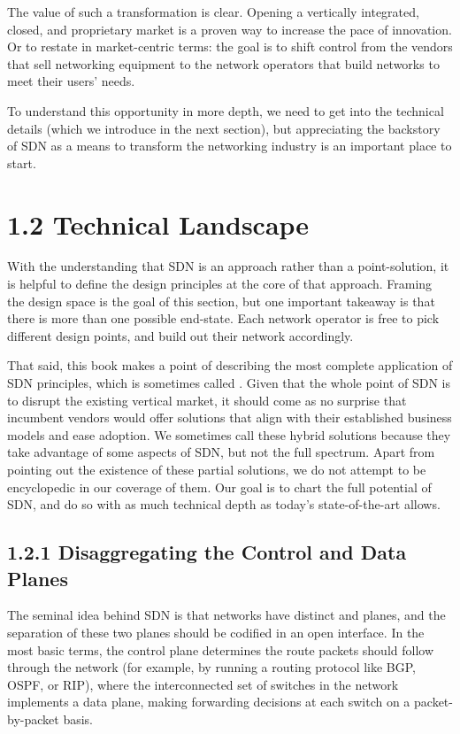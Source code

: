 \documentclass[letterpaper,11pt,english]{sphinxmanual}
\begin{document}
The value of such a transformation is clear. Opening a vertically
integrated, closed, and proprietary market is a proven way to increase
the pace of innovation. Or to restate in market-centric terms: the
goal is to shift control from the vendors that sell networking
equipment to the network operators that build networks to meet their
users’ needs.

To understand this opportunity in more depth, we need to get into the
technical details (which we introduce in the next section), but
appreciating the backstory of SDN as a means to transform the
networking industry is an important place to start.


\section{1.2 Technical Landscape}
\label{\detokenize{intro:technical-landscape}}
With the understanding that SDN is an approach rather than a
point-solution, it is helpful to define the design principles at the
core of that approach. Framing the design space is the goal of this
section, but one important takeaway is that there is more than one
possible end-state. Each network operator is free to pick different
design points, and build out their network accordingly.

That said, this book makes a point of describing the most complete
application of SDN principles, which is sometimes called . Given that the whole point of SDN is to disrupt the existing
vertical market, it should come as no surprise that incumbent vendors
would offer  solutions that align with their established
business models and ease adoption. We sometimes call these hybrid
solutions  because they take advantage of some aspects of
SDN, but not the full spectrum. Apart from pointing out the existence
of these partial solutions, we do not attempt to be encyclopedic in
our coverage of them. Our goal is to chart the full potential of SDN,
and do so with as much technical depth as today’s state-of-the-art
allows.


\subsection{1.2.1 Disaggregating the Control and Data Planes}
\label{\detokenize{intro:disaggregating-the-control-and-data-planes}}
The seminal idea behind SDN is that networks have distinct 
and  planes, and the separation of these two planes should be
codified in an open interface. In the most basic terms, the control
plane determines the route packets should follow through the network
(for example, by running a routing protocol like BGP, OSPF, or RIP),
where the interconnected set of switches in the network implements a
data plane, making forwarding decisions at each switch on a
packet-by-packet basis.
\end{document}
